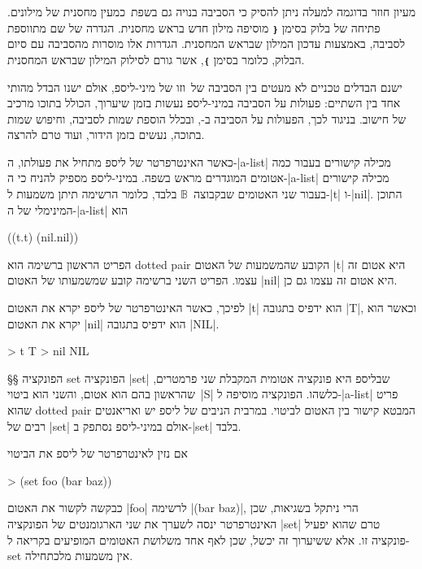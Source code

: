 מעיון חוזר בדוגמה למעלה ניתן להסיק כי הסביבה בנויה גם בשפת~\CPL כמעין מחסנית
של מילונים. פתיחה של בלוק בסימן \texttt{❴} מוסיפה מילון חדש בראש מחסנית. הגדרה
של שם מתווספת לסביבה, באמצעות עדכון המילון שבראש המחסנית. הגדרות אלו מוסרות
מהסביבה עם סיום הבלוק, כלומר בסימן \texttt{❵}, אשר גורם לסילוק המילון שבראש המחסנית.

ישנם הבדלים טכניים לא מעטים בין הסביבה של~\CPL וזו של מיני-ליספ, אולם ישנו הבדל
מהותי אחד בין השתיים: פעולות על הסביבה במיני-ליספ נעשות בזמן שיערוך, הכולל בתוכו
מרכיב של חישוב. בניגוד לכך, הפעולות על הסביבה ב-\CPL, ובכלל הוספת שמות לסביבה,
וחיפוש שמות בתוכה, נעשים בזמן הידור, ועוד טרם להרצה.

כאשר האינטרפרטר של ליספ מתחיל את פעולתו, ה-\E|a-list| מכילה קישורים בעבור כמה
אטומים המוגדרים מראש בשפה. במיני-ליספ מספיק להניח כי ה-\E|a-list| מכילה קישורים
בעבור שני האטומים שבקבוצה~$𝔹$ בלבד, כלומר הרשימה תיתן משמעות ל-\E|t| ו-\E|nil|.
התוכן המינימלי של ה-\E|a-list| הוא
\begin{LISP}
((t.t)
     (nil.nil))
\end{LISP}

הפריט הראשון ברשימה הוא dotted pair הקובע שהמשמעות של האטום \T|t| היא אטום זה
עצמו. הפריט השני ברשימה קובע שמשמעותו של האטום \T|nil| היא אטום זה עצמו גם כן.

לפיכך, כאשר האינטרפרטר של ליספ יקרא את האטום \T|t| הוא ידפיס בתגובה \T|T|,
וכאשר הוא יקרא את האטום \T|nil| הוא ידפיס בתגובה \T|NIL|.
\begin{LISP}
> t
T
> nil
NIL
\end{LISP}

§§ הפונקציה set
הפונקציה \T|set| שבליספ היא פונקציה אטומית המקבלת שני פרמטרים, שהראשון בהם
הוא אטום, והשני הוא ביטוי~\E|S| כלשהו. הפונקציה מוסיפה ל-\E|a-list| פריט שהוא
dotted pair המבטא קישור בין האטום לביטוי. במרבית הניבים של ליספ יש ואריאנטים
רבים של \T|set| אולם במיני-ליספ נסתפק ב-\T|set| בלבד.

אם נזין לאינטרפרטר של ליספ את הביטוי
\begin{LISP}
> (set foo (bar baz))
\end{LISP}
כבקשה לקשור את האטום \T|foo| לרשימה \T|(bar baz)|, הרי ניתקל בשגיאות, שכן
האינטרפרטר ינסה לשערך את שני הארגומנטים של הפונקציה \E|set| טרם שהוא יפעיל
פונקציה זו. אלא ששיערוך זה יכשל, שכן לאף אחד משלושת האטומים המופיעים בקריאה
ל-set אין משמעות מלכתחילה.

